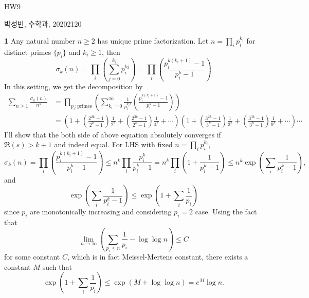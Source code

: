 \documentclass[a4paper, 12pt]{article}
\theoremstyle{Mydefinition}
\theoremstyle{Mytheorem}
\begin{document}
\thispagestyle{myfirstpage}
\begin{center}
	\Large{HW9}
\end{center}
박성빈, 수학과, 20202120

\noindent \textbf{1} Any natural number $n\geq 2$ has unique prime factorization. Let $n=\prod_{i} p_i^{k_i}$ for distinct primes $\{p_i\}$ and $k_i\geq 1$, then
\begin{equation}
    \sigma_k(n) = \prod_i\left(\sum_{j=0}^{k_i} p_i^{kj}\right) = \prod_i\left(\frac{p_i^{k(k_i+1)}-1}{p_i^k-1}\right)
\end{equation}
In this setting, we get the decomposition by
\begin{equation}
\begin{split}
    \sum_{n\geq 1}\frac{\sigma_k(n)}{n^s} &= \prod_{p_i:\textrm{primes}}\left(\sum_{k_i=0}^\infty \frac{1}{p_i^{k_is}}\left(\frac{p_i^{k(k_i+1)}-1}{p_i^k-1}\right)\right)\\
    &=\left(1+\left(\frac{2^{2k}-1}{2^k-1}\right)\frac{1}{2^s} + \left(\frac{2^{3k}-1}{2^k-1}\right)\frac{1}{4^s} + \cdots\right)\left(1+\left(\frac{3^{2k}-1}{3^k-1}\right)\frac{1}{3^s} + \left(\frac{3^{3k}-1}{3^k-1}\right)\frac{1}{9^s} + \cdots\right)\cdots
\end{split}
\end{equation}
I'll show that the both side of above equation absolutely converges if $\Re(s)>k+1$ and indeed equal. For LHS with fixed $n=\prod_{i} p_i^{k_i}$,
\begin{equation}
    \sigma_k(n) = \prod_i\left(\frac{p_i^{k(k_i+1)}-1}{p_i^k-1}\right)\leq n^k\prod_i \frac{p_i^k}{p_i^k-1} = n^k\prod_i \left(1+\frac{1}{p_i^k-1}\right) \leq n^k \exp\left(\sum_{i}\frac{1}{p_i^k-1}\right),
\end{equation}
and
\begin{equation}
    \exp\left(\sum_{i}\frac{1}{p_i^k-1}\right)\leq \exp\left(1+\sum_{i}\frac{1}{p_i}\right)
\end{equation}
since $p_i$ are monotonically increasing and considering $p_i=2$ case. Using the fact that 
\begin{equation}
    \lim_{n\rightarrow \infty}\left(\sum_{p_i\leq n}\frac{1}{p_i}-\log\log n\right) \leq C
\end{equation}
for some constant $C$, which is in fact Meissel-Mertens constant, there exists a constant $M$ such that
\begin{equation}
    \exp\left(1+\sum_{i}\frac{1}{p_i}\right)\leq \exp\left(M+\log\log n\right) = e^M \log n.
\end{equation}
\end{document}
